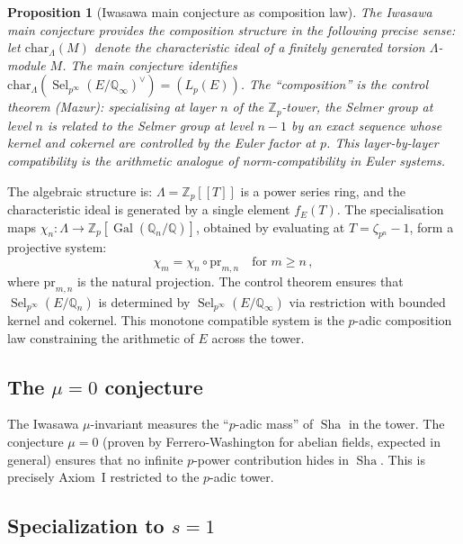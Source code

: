 \documentclass[aps,prd,twocolumn,superscriptaddress,nofootinbib]{revtex4-2}
\newtheorem{proposition}[theorem]{Proposition}
\theoremstyle{definition}
\theoremstyle{remark}
\DeclareMathOperator{\Sel}{Sel}
\DeclareMathOperator{\Sha}{Sha}
\DeclareMathOperator{\Gal}{Gal}
\begin{document}
\begin{proposition}[Iwasawa main conjecture as composition law]
\label{prop:iwasawa_composition}
The Iwasawa main conjecture provides the composition structure in the following precise sense: let $\mathrm{char}_\Lambda(M)$ denote the characteristic ideal of a finitely generated torsion $\Lambda$-module $M$. The main conjecture identifies $\mathrm{char}_\Lambda(\Sel_{p^\infty}(E/\mathbb{Q}_\infty)^\vee) = (L_p(E))$. The ``composition'' is the control theorem (Mazur): specialising at layer $n$ of the $\mathbb{Z}_p$-tower, the Selmer group at level $n$ is related to the Selmer group at level $n-1$ by an exact sequence whose kernel and cokernel are controlled by the Euler factor at $p$. This layer-by-layer compatibility is the arithmetic analogue of norm-compatibility in Euler systems.
\end{proposition}

The algebraic structure is: $\Lambda = \mathbb{Z}_p[[T]]$ is a power series ring, and the characteristic ideal is generated by a single element $f_E(T)$. The specialisation maps $\chi_n: \Lambda \to \mathbb{Z}_p[\Gal(\mathbb{Q}_n/\mathbb{Q})]$, obtained by evaluating at $T = \zeta_{p^n} - 1$, form a projective system:
\begin{equation}
\chi_m = \chi_n \circ \mathrm{pr}_{m,n} \quad \text{for } m \geq n\,,
\end{equation}
where $\mathrm{pr}_{m,n}$ is the natural projection. The control theorem ensures that $\Sel_{p^\infty}(E/\mathbb{Q}_n)$ is determined by $\Sel_{p^\infty}(E/\mathbb{Q}_\infty)$ via restriction with bounded kernel and cokernel. This monotone compatible system is the $p$-adic composition law constraining the arithmetic of $E$ across the tower.

\subsection{The $\mu = 0$ conjecture}

The Iwasawa $\mu$-invariant measures the ``$p$-adic mass'' of $\Sha$ in the tower. The conjecture $\mu = 0$ (proven by Ferrero-Washington for abelian fields, expected in general) ensures that no infinite $p$-power contribution hides in $\Sha$. This is precisely Axiom~I restricted to the $p$-adic tower.

\subsection{Specialization to $s = 1$}
\end{document}
